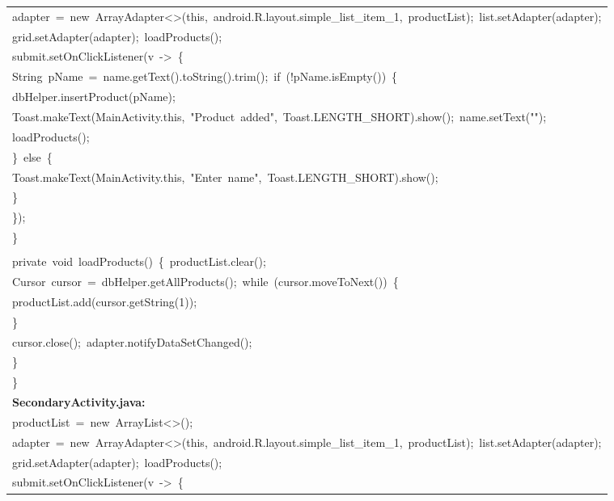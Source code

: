 \documentclass[a4paper,12pt]{article}
\begin{document}
\begin{longtable}{|p{}|}
{\ttfamily\small adapter\ =\ new\ ArrayAdapter\textless{}\textgreater{}(this,\ android.R.layout.simple\_list\_item\_1,\ productList);\ list.setAdapter(adapter);} \\
{\ttfamily\small grid.setAdapter(adapter);\ loadProducts();} \\
{\ttfamily\small submit.setOnClickListener(v\ -\textgreater{}\ \{} \\
{\ttfamily\small String\ pName\ =\ name.getText().toString().trim();\ if\ (!pName.isEmpty())\ \{} \\
{\ttfamily\small dbHelper.insertProduct(pName);} \\
{\ttfamily\small Toast.makeText(MainActivity.this,\ "Product\ added",\ Toast.LENGTH\_SHORT).show();\ name.setText("");} \\
{\ttfamily\small loadProducts();} \\
{\ttfamily\small \}\ else\ \{} \\
{\ttfamily\small Toast.makeText(MainActivity.this,\ "Enter\ name",\ Toast.LENGTH\_SHORT).show();} \\
{\ttfamily\small \}} \\
{\ttfamily\small \});} \\
{\ttfamily\small \}} \\
\strut \\
{\ttfamily\small private\ void\ loadProducts()\ \{\ productList.clear();} \\
{\ttfamily\small Cursor\ cursor\ =\ dbHelper.getAllProducts();\ while\ (cursor.moveToNext())\ \{} \\
{\ttfamily\small productList.add(cursor.getString(1));} \\
{\ttfamily\small \}} \\
{\ttfamily\small cursor.close();\ adapter.notifyDataSetChanged();} \\
{\ttfamily\small \}} \\
{\ttfamily\small \}} \\
\hline
\rule{0pt}{13pt}\textbf{SecondaryActivity.java:} \\
\hline
{\ttfamily\small productList\ =\ new\ ArrayList\textless{}\textgreater{}();} \\
{\ttfamily\small adapter\ =\ new\ ArrayAdapter\textless{}\textgreater{}(this,\ android.R.layout.simple\_list\_item\_1,\ productList);\ list.setAdapter(adapter);} \\
{\ttfamily\small grid.setAdapter(adapter);\ loadProducts();} \\
{\ttfamily\small submit.setOnClickListener(v\ -\textgreater{}\ \{} \\

\end{longtable}
\end{document}
